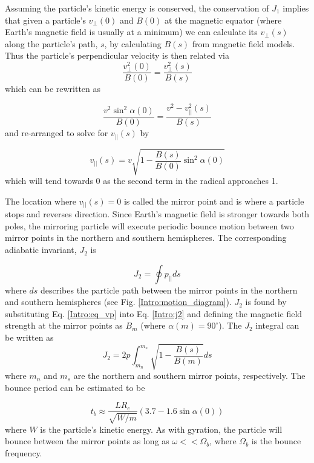 Assuming the particle's kinetic energy is conserved, the conservation of $J_1$ implies that given a particle's $v_\perp(0)$ and $B(0)$ at the magnetic equator (where Earth's magnetic field is usually at a minimum) we can calculate its $v_\perp(s)$ along the particle's path, $s$, by calculating $B(s)$ from magnetic field models. Thus the particle's perpendicular velocity is then related via
\begin{equation} \label{j1_conservation}
\frac{v_\perp^2 (0)}{B(0)} = \frac{v_\perp^2 (s)}{B(s)}
\end{equation} which can be rewritten as 

\begin{equation}
\frac{v^2 \sin^2{\alpha(0)}}{B(0)} = \frac{v^2 - v^2_{||}(s)}{B(s)}
\end{equation} and re-arranged to solve for $v_{||}(s)$ by

\begin{equation} \label{Intro:eq_vp} 
v_{||}(s) = v \sqrt{1 - \frac{B(s)}{B(0)} \sin^2{\alpha(0)}}
\end{equation} which will tend towards 0 as the second term in the radical approaches 1.

The location where $v_{||}(s) = 0$ is called the mirror point and is where a particle stops and reverses direction. Since Earth's magnetic field is stronger towards both poles, the mirroring particle will execute periodic bounce motion between two mirror points in the northern and southern hemispheres. The corresponding adiabatic invariant, $J_2$ is

\begin{equation} \label{Intro:j2}
J_2 = \oint p_{||} ds
\end{equation} where $ds$ describes the particle path between the mirror points in the northern and southern hemispheres (see Fig. \ref{Intro:motion_diagram}). $J_2$ is found by substituting Eq. \ref{Intro:eq_vp} into Eq. \ref{Intro:j2} and defining the magnetic field strength at the mirror points as $B_m$ (where $\alpha(m) = 90^\circ$). The $J_2$ integral can be written as     
\begin{equation}
J_2 = 2 p \int_{m_n}^{m_s} \sqrt{1 - \frac{B(s)}{B(m)}} ds
\end{equation} where $m_n$ and $m_s$ are the northern and southern mirror points, respectively. The bounce period can be estimated \citep[e.g.][]{Baumjohann1997} to be 

\begin{equation}
t_b \approx \frac{L R_e}{\sqrt{W/m}} (3.7 - 1.6 \sin{\alpha(0)})
\end{equation} where $W$ is the particle's kinetic energy. As with gyration, the particle will bounce between the mirror points as long as $\omega << \Omega_b$, where $\Omega_b$ is the bounce frequency.

